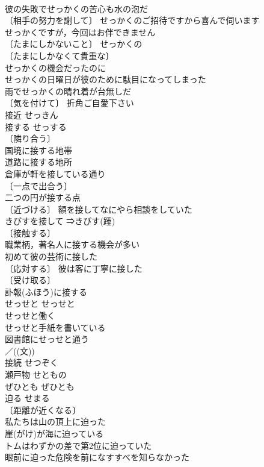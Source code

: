 \documentclass[8pt]{extreport}
\begin{document}
\begin{CJK}{UTF8}{min}
\\	彼の失敗でせっかくの苦心も水の泡だ 
\\	〔相手の努力を謝して〕 せっかくのご招待ですから喜んで伺います 
\\	せっかくですが，今回はお伴できません 
\\	〔たまにしかないこと〕 せっかくの 
\\	〔たまにしかなくて貴重な〕
\\	せっかくの機会だったのに 
\\	せっかくの日曜日が彼のために駄目になってしまった 
\\	雨でせっかくの晴れ着が台無しだ 
\\	〔気を付けて〕 折角ご自愛下さい 
\\	接近	せっきん	
\\	接する	せっする	
\\	〔隣り合う〕
\\	国境に接する地帯 
\\	道路に接する地所 
\\	倉庫が軒を接している通り 
\\	〔一点で出合う〕
\\	二つの円が接する点 
\\	〔近づける〕 額を接してなにやら相談をしていた 
\\	きびすを接して ⇒きびす(踵) 
\\	〔接触する〕
\\	職業柄，著名人に接する機会が多い 
\\	初めて彼の芸術に接した 
\\	〔応対する〕 彼は客に丁寧に接した 
\\	〔受け取る〕
\\	訃報(ふほう)に接する 
\\	せっせと	せっせと	
\\	せっせと働く 
\\	せっせと手紙を書いている 
\\	図書館にせっせと通う 
\\	／((文))
\\	接続	せつぞく	
\\	瀬戸物	せともの	
\\	ぜひとも	ぜひとも	
\\	迫る	せまる	
\\	〔距離が近くなる〕
\\	私たちは山の頂上に迫った 
\\	崖(がけ)が海に迫っている 
\\	トムはわずかの差で第2位に迫っていた 
\\	眼前に迫った危険を前になすすべを知らなかった 

\end{CJK}
\end{document}
